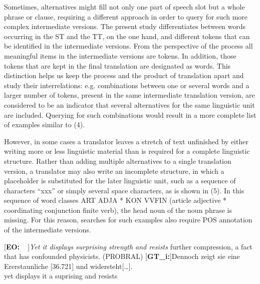\documentclass[output=paper]{LSP/langsci}
\begin{document}
Sometimes, alternatives might fill not only one part of speech slot but a whole phrase or clause, requiring a different approach in order to query for such more complex intermediate versions. The present study differentiates between words occurring in the ST and the TT, on the one hand, and different tokens that can be identified in the intermediate versions. From the perspective of the process all meaningful items in the intermediate versions are tokens. In addition, those tokens that are kept in the final translation are designated as words. This distinction helps us keep the process and the product of translation apart and study their interrelations: e.g. combinations between one or several words and a larger number of tokens, present in the same intermediate translation version, are considered to be an indicator that several alternatives for the same linguistic unit are included. Querying for such combinations would result in a more complete list of examples similar to (4).
 
However, in some cases a translator leaves a stretch of text unfinished by either writing more or less linguistic material than is required for a complete linguistic structure. Rather than adding multiple alternatives to a single translation version, a translator may also write an incomplete structure, in which a placeholder is substituted for the later linguistic unit, such as a sequence of characters “xxx” or simply several space characters, as is shown in (5). In this sequence of word classes ART ADJA * KON VVFIN (article adjective * coordinating conjunction finite verb), the head noun of the noun phrase is missing. For this reason, searches for such examples also require POS annotation of the intermediate versions.



\ea
\begin{xlist}
\exi{}[\textbf{EO:~~}]{\emph{Yet it displays surprising strength and resists} further compression, a fact that has confounded physicists. (PROBRAL)}
\exi{}[\textbf{GT\_i:}]{\gll  Denno\stern{}ch\raute\stern\stern\stern\stern\stern{} zeigt\stern\raute{} sie\raute{} eine\raute{} Er\pfeil\pfeil\pfeil\raute{}erstaun\stern\stern{}liche\raute{} [\stern{}36.721] \raute\raute\stern{} und\raute\stern\stern\stern\stern\stern\stern{} widersteht[{\dots}].\\
 yet displays it a suprising\raute{}\raute{}\raute{} {} \raute{}\raute{} and resists \\
}
\end{xlist}
\z
\end{document}
